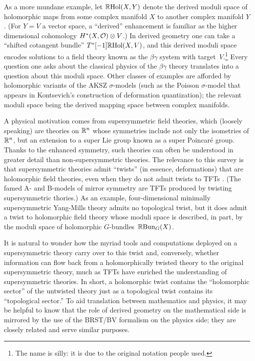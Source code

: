 \documentclass[11pt]{amsart}
\begin{document}
As a more mundane example, let $\mathbb R{\rm Hol}(X,Y)$ denote the derived moduli space of holomorphic maps from some complex manifold $X$ to another complex manifold $Y$.
(For $Y = V$ a vector space, a ``derived'' enhancement is familiar as the higher dimensional cohomology $H^*(X, \mathcal O) \otimes V$.)
In derived geometry one can take a ``shifted cotangent bundle'' $T^*[-1] \mathbb R{\rm Hol}(X,V)$,
and this derived moduli space encodes solutions to
a field theory known as the $\beta\gamma$ system with target~$V$.\footnote{The name is silly: it is due to the original notation people used.}
Every question one asks about the classical physics of the $\beta\gamma$ theory translates into a question about this moduli space.
Other classes of examples are afforded by holomorphic variants of the AKSZ $\sigma$-models (such as the Poisson $\sigma$-model that appears in Kontsevich's construction of deformation quantization); 
the relevant moduli space being the derived mapping space between complex manifolds. 

A physical motivation comes from supersymmetric field theories, 
which (loosely speaking) are theories on $\mathbb R^n$ whose symmetries include not only the isometries of $\mathbb R^n$, but an extension to a super Lie group known as a super Poincar\'e group.
Thanks to the enhanced symmetry, such theories can often be understood in greater detail than non-supersymmetric theories.
The relevance to this survey is that supersymmetric theories admit ``twists'' (in essence, deformations) that are holomorphic field theories, 
even when they do not admit twists to TFTs \cite{CosHol}. 
(The famed A- and B-models of mirror symmetry are TFTs produced by twisting supersymmetric thories.)
As an example, four-dimensional minimally supersymmetric Yang-Mills theory admits no topological twist, 
but it does admit a twist to holomorphic field theory whose moduli space is described, in part, by the moduli space of holomorphic $G$-bundles~$\mathbb R {\rm Bun}_G(X)$. 

It is natural to wonder how the myriad tools and computations deployed on a supersymmetric theory carry over to this twist 
and, conversely, whether information can flow back from a holomorphically twisted theory to the original supersymmetric theory, 
much as TFTs have enriched the understanding of supersymmetric theories.
In short, a holomorphic twist contains the ``holomorphic sector'' of the untwisted theory just as a topological twist contains its ``topological sector.''
To aid translation between mathematics and physics, 
it may be helpful to know that the role of derived geometry on the mathematical side is mirrored by the use of the BRST/BV formalism on the physics side;
they are closely related and serve similar purposes.
\end{document}
